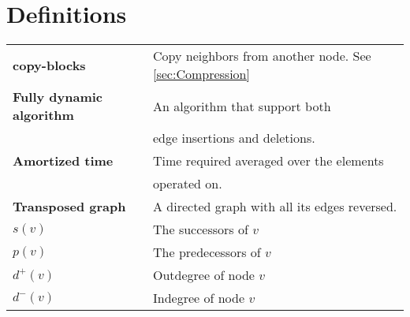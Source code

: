 \chapter*{Definitions}


\begin{tabular}{>{\bfseries}l l }
    copy-blocks & Copy neighbors from another node. See \ref{sec:Compression} \\
    Fully dynamic algorithm & An algorithm that support both \\
     & edge insertions and deletions.  \\
    Amortized time & Time required averaged over the elements \\ 
    & operated on. \\
    Transposed graph & A directed graph with all its edges reversed. \\
    $s(v)$   & The successors of $v$ \\
    $p(v)$   & The predecessors of $v$ \\
    $d^+(v)$ & Outdegree of node $v$\\
    $d^-(v)$ & Indegree of node $v$
\end{tabular}

